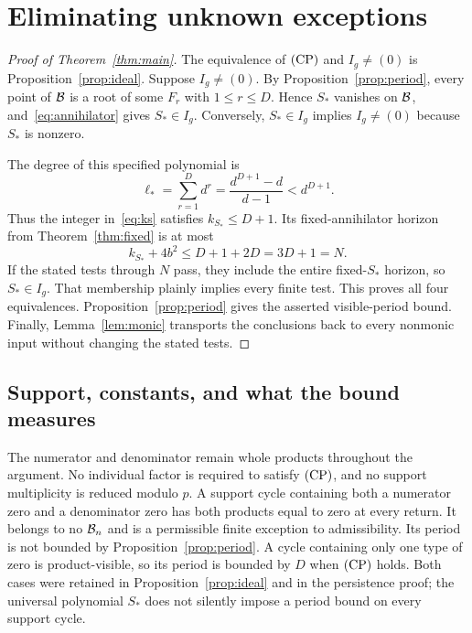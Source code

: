 \section{Eliminating unknown exceptions}\label{sec:decision}

\begin{proof}[Proof of Theorem~\ref{thm:main}]
The equivalence of $\mathrm{(CP)}$ and $I_g\ne(0)$ is
Proposition~\ref{prop:ideal}. Suppose $I_g\ne(0)$. By
Proposition~\ref{prop:period}, every point of $\mathcal B$ is a root
of some $F_r$ with $1\le r\le D$. Hence $S_*$ vanishes on
$\mathcal B$, and~\eqref{eq:annihilator} gives $S_*\in I_g$.
Conversely, $S_*\in I_g$ implies $I_g\ne(0)$ because $S_*$
is nonzero.

The degree of this specified polynomial is
\begin{equation}\label{eq:star-degree}
 \ell_* =\sum_{r=1}^{D}d^r
        =\frac{d^{D+1}-d}{d-1}<d^{D+1}.
\end{equation}
Thus the integer in~\eqref{eq:ks} satisfies $k_{S_*}\le D+1$.
Its fixed-annihilator horizon from Theorem~\ref{thm:fixed} is at
most
\begin{equation}\label{eq:finalhorizon}
 k_{S_*}+4b^2\le D+1+2D=3D+1=N.
\end{equation}
If the stated tests through $N$ pass, they include the entire
fixed-$S_*$ horizon, so $S_*\in I_g$. That membership plainly
implies every finite test. This proves all four equivalences.
Proposition~\ref{prop:period} gives the asserted visible-period
bound. Finally, Lemma~\ref{lem:monic} transports the conclusions
back to every nonmonic input without changing the stated tests.
\end{proof}

\subsection{Support, constants, and what the bound measures}

The numerator and denominator remain whole products throughout
the argument. No individual factor is required to satisfy $\mathrm{(CP)}$,
and no support multiplicity is reduced modulo $p$. A support cycle
containing both a numerator zero and a denominator zero has both
products equal to zero at every return. It belongs to no $\mathcal B_n$
and is a permissible finite exception to admissibility. Its period
is not bounded by Proposition~\ref{prop:period}. A cycle containing
only one type of zero is product-visible, so its period is bounded
by $D$ when $\mathrm{(CP)}$ holds. Both cases were retained in
Proposition~\ref{prop:ideal} and in the persistence proof; the
universal polynomial $S_*$ does not silently impose a period bound
on every support cycle.

